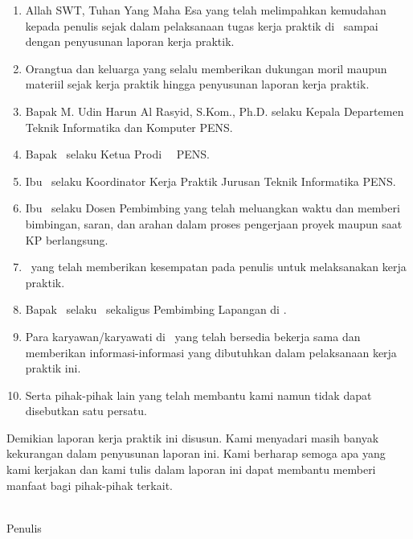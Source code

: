 \begin{enumerate}[label=\arabic*., leftmargin=*, itemsep=0pt]
  \item Allah SWT, Tuhan Yang Maha Esa yang telah melimpahkan kemudahan kepada penulis
        sejak dalam pelaksanaan tugas kerja praktik di \NamaPerusahaan\ sampai dengan
        penyusunan laporan kerja praktik.
  \item Orangtua dan keluarga yang selalu memberikan dukungan moril maupun materiil sejak
        kerja praktik hingga penyusunan laporan kerja praktik.
  \item Bapak M. Udin Harun Al Rasyid, S.Kom., Ph.D. selaku Kepala Departemen Teknik
        Informatika dan Komputer PENS.
  \item Bapak \NamaKetuaProdi\ selaku Ketua Prodi \JenjangProdi\ \NamaProdi\ PENS.
  \item Ibu \NamaKoordinatorKP\ selaku Koordinator Kerja Praktik Jurusan Teknik Informatika PENS.
  \item Ibu \NamaPembimbing\ selaku Dosen Pembimbing yang telah meluangkan waktu dan
        memberi bimbingan, saran, dan arahan dalam proses pengerjaan proyek maupun saat KP
        berlangsung.
  \item \NamaPerusahaan\ yang telah memberikan kesempatan pada penulis untuk melaksanakan
        kerja praktik.
  \item Bapak \NamaPembimbingLapangan\ selaku \JabatanPembimbingLapangan\ sekaligus
        Pembimbing Lapangan di \NamaPerusahaan.
  \item Para karyawan/karyawati di \NamaPerusahaan\ yang telah bersedia bekerja sama dan
        memberikan informasi-informasi yang dibutuhkan dalam pelaksanaan kerja praktik ini.
  \item Serta pihak-pihak lain yang telah membantu kami namun tidak dapat disebutkan satu
        persatu.
\end{enumerate}

Demikian laporan kerja praktik ini disusun. Kami menyadari masih banyak kekurangan dalam
penyusunan laporan ini. Kami berharap semoga apa yang kami kerjakan dan kami tulis dalam
laporan ini dapat membantu memberi manfaat bagi pihak-pihak terkait.

\vspace{1cm}
\begin{flushright}
  \TanggalPengesahan\\[0.8cm]
  Penulis
\end{flushright}
